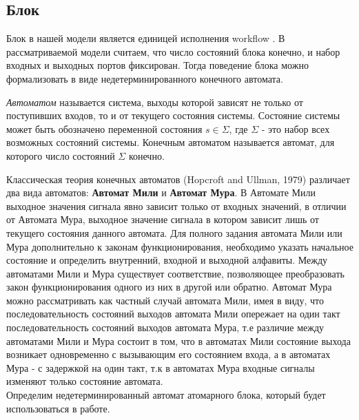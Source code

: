 \documentclass[koi8-r,usehyperref,12pt]{G7-32}
\begin{document}
\subsection{Блок}
Блок в нашей модели является единицей исполнения workflow . В рассматриваемой модели считаем, что число состояний блока конечно, и набор входных и выходных портов фиксирован. Тогда поведение блока можно формализовать в виде недетерминированного конечного автомата.

\textit{Автоматом} называется система, выходы которой зависят не только от поступивших входов, то и от текущего состояния системы.
Состояние системы может быть обозначено переменной состояния $s \in \Sigma$, где $\Sigma$  - это набор всех возможных состояний системы. Конечным автоматом называется автомат, для которого число состояний $\Sigma$ конечно.

Классическая теория конечных автоматов  (Hopcroft and Ullman, 1979) различает два вида автоматов: \textbf{Автомат Мили} и \textbf{Автомат Мура}. В Автомате Мили выходное значения сигнала явно зависит только от входных значений, в отличии от Автомата Мура, выходное значение сигнала в котором зависит лишь от текущего состояния данного автомата. Для полного задания автомата Мили или  Мура  дополнительно к законам функционирования, необходимо указать начальное состояние и определить внутренний, входной и выходной алфавиты. Между автоматами Мили и Мура существует соответствие, позволяющее преобразовать закон функционирования одного из них в другой или обратно. Автомат Мура можно рассматривать как частный случай автомата Мили, имея в виду, что последовательность состояний выходов автомата Мили опережает на один такт последовательность состояний выходов автомата Мура, т.е различие между автоматами Мили и Мура состоит в том, что в автоматах Мили состояние выхода возникает одновременно с вызывающим его состоянием входа, а в автоматах Мура - с задержкой на один такт, т.к в автоматах Мура входные сигналы изменяют только состояние автомата.\\

Определим недетерминированный автомат атомарного блока, который будет использоваться в работе.\\
\end{document}
